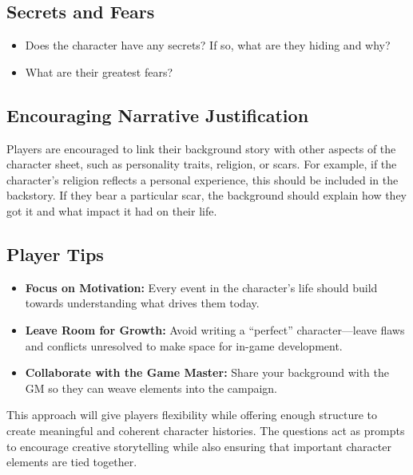 \documentclass[12pt]{book}  %
\begin{document}
\subsection*{Secrets and Fears}

\begin{itemize}
    \item Does the character have any secrets? If so, what are they hiding and why?
    \item What are their greatest fears?
\end{itemize}

\subsection*{Encouraging Narrative Justification}

Players are encouraged to link their background story with other aspects of the character sheet, such as personality traits, religion, or scars. For example, if the character's religion reflects a personal experience, this should be included in the backstory. If they bear a particular scar, the background should explain how they got it and what impact it had on their life.

\subsection*{Player Tips}

\begin{itemize}
    \item \textbf{Focus on Motivation:} Every event in the character's life should build towards understanding what drives them today.
    \item \textbf{Leave Room for Growth:} Avoid writing a ``perfect'' character—leave flaws and conflicts unresolved to make space for in-game development.
    \item \textbf{Collaborate with the Game Master:} Share your background with the GM so they can weave elements into the campaign.
\end{itemize}

This approach will give players flexibility while offering enough structure to create meaningful and coherent character histories. The questions act as prompts to encourage creative storytelling while also ensuring that important character elements are tied together.

\end{document}
